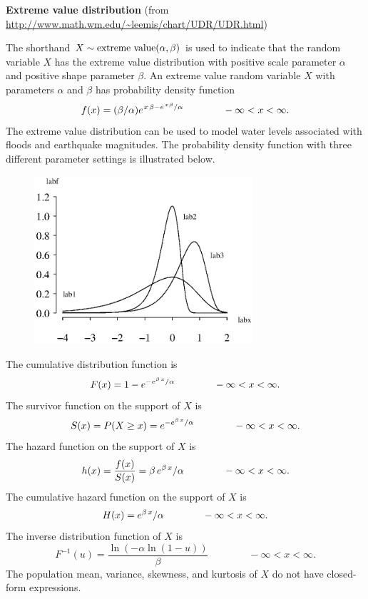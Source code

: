 \documentclass[12pt,fullpage]{article}
\begin{document}
\noindent
{\bf Extreme value distribution} (from \color{blue}\url{http://www.math.wm.edu/~leemis/chart/UDR/UDR.html}\color{black})

\noindent
The shorthand $X \sim {\rm extreme \ value}(\alpha,\beta)$ is used to indicate that the
random variable $X$ has the extreme value distribution with positive scale parameter $\alpha$ and positive shape parameter $\beta$.
An extreme value random variable $X$ with parameters $\alpha$ and $\beta$ has probability density function 
$$
f(x) = (\beta/\alpha)e^{\kern 0.08 em x \kern 0.08 em \beta-e^{\kern 0.08 em x \kern 0.04 em \beta}/\alpha} \qquad \qquad -\infty<x<\infty.
$$
The extreme value distribution can be used to model water levels associated with floods and earthquake magnitudes.
The probability density function with three different parameter settings is illustrated below.
{\begin{figure}[h!]
\begin{center}
\includegraphics[width=3.2in]{ExtremevaluePlot.ps}
\end{center}
\end{figure}}

\noindent
The cumulative distribution function is
$$
F(x) =  1 - {{e}^{-{{{e}^{{\it \beta}\,x}}/{\it \alpha}}}} \qquad \qquad -\infty<x<\infty.
$$
The survivor function on the support of $X$ is
$$
S(x) = P(X \ge x) ={{e}^{-{{{e}^{{\it \beta}\,x}}/{\it \alpha}}}} \qquad \qquad -\infty<x<\infty.
$$
The hazard function on the support of $X$ is
$$
h(x) = \frac{f(x)}{S(x)} = {\it \beta}\,{{ e}^{{\it \beta}\,x}}/{\it \alpha} \qquad \qquad -\infty<x<\infty.
$$
The cumulative hazard function on the support of $X$ is
$$
H(x) = {{e}^{{\it \beta}\,x}}/{\it \alpha} \qquad \qquad -\infty<x<\infty.
$$
The inverse distribution function of $X$ is
$$
F ^ {-1}(u) = \frac{\ln  \left(- \alpha \ln
 \left( 1-u \right) \right)}{\beta}
\qquad \qquad -\infty<x<\infty.
$$
The population mean, variance, skewness, and kurtosis of $X$ do not have closed-form expressions.
\end{document}
